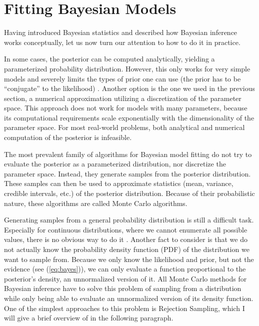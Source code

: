 \documentclass[12pt, a4paper]{report}
\begin{document}
\section{Fitting Bayesian Models}
Having introduced Bayesian statistics and described how Bayesian inference works conceptually, let us now turn our attention to how to do it in practice.

In some cases, the posterior can be computed analytically, yielding a parameterized probability distribution.
However, this only works for very simple models and severely limits the types of prior one can use (the prior has to be ``conjugate'' to the likelihood) \cite[39]{mcelreath}.
Another option is the one we used in the previous section, a numerical approximation utilizing a discretization of the parameter space.
This approach does not work for models with many parameters, because its computational requirements scale exponentially with the dimensionality of the parameter space.
For most real-world problems, both analytical and numerical computation of the posterior is infeasible.

The most prevalent family of algorithms for Bayesian model fitting do not try to evaluate the posterior as a parameterized distribution, nor discretize the parameter space.
Instead, they generate samples from the posterior distribution.
These samples can then be used to approximate statistics (mean, variance, credible intervals, etc.) of the posterior distribution.
Because of their probabilistic nature, these algorithms are called Monte Carlo algorithms.

Generating samples from a general probability distribution is still a difficult task.
Especially for continuous distributions, where we cannot enumerate all possible values, there is no obvious way to do it \cite[358]{mckay}.
Another fact to consider is that we do not actually know the probability density function (PDF) of the distribution we want to sample from.
Because we only know the likelihood and prior, but not the evidence (see (\ref{eq:bayes})), we can only evaluate a function proportional to the posterior's density, an unnormalized version of it.
All Monte Carlo methods for Bayesian inference have to solve this problem of sampling from a distribution while only being able to evaluate an unnormalized version of its density function.
One of the simplest approaches to this problem is Rejection Sampling, which I will give a brief overview of in the following paragraph.
\end{document}
